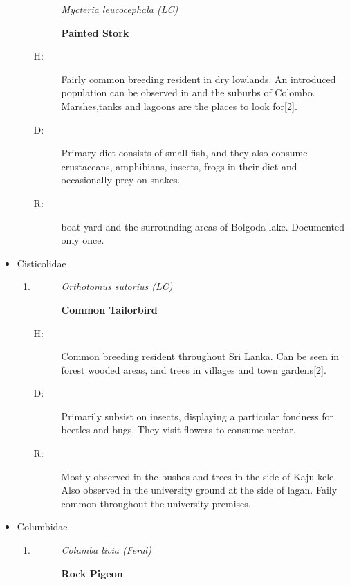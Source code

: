 \begin{itemize}
\begin{enumerate}
\begin{description}%
\item[]%
\textit{Mycteria leucocephala (LC)}%
\item[]%
\textbf{Painted Stork}%
\end{description}%
\begin{description}%
\item[H: ]%
Fairly common breeding resident in dry lowlands. An introduced population can be observed in and the suburbs of Colombo. Marshes,tanks and lagoons are the places to look for{[}2{]}.%
\item[D: ]%
Primary diet consists of small fish, and they also consume crustaceans, amphibians, insects, frogs in their diet and occasionally prey on snakes.%
\item[R: ]%
boat yard and the surrounding areas of Bolgoda lake. Documented only once.%
\end{description}%
\end{enumerate}%
\item%
Cisticolidae%
\begin{enumerate}%
\item%
\begin{description}%
\item[]%
\textit{Orthotomus sutorius (LC)}%
\item[]%
\textbf{Common Tailorbird}%
\end{description}%
\begin{description}%
\item[H: ]%
Common breeding resident throughout Sri Lanka. Can be seen in forest wooded areas, and trees in villages and town gardens{[}2{]}.%
\item[D: ]%
Primarily subsist on insects, displaying a particular fondness for beetles and bugs. They visit flowers to consume nectar.%
\item[R: ]%
Mostly observed in the bushes and trees in the side of Kaju kele. Also observed in the university ground at the side of lagan. Faily common throughout the university premises.%
\end{description}%
\end{enumerate}%
\item%
Columbidae%
\begin{enumerate}%
\item%
\begin{description}%
\item[]%
\textit{Columba livia (Feral)}%
\item[]%
\textbf{Rock Pigeon}%

\end{description}
\end{enumerate}
\end{itemize}
